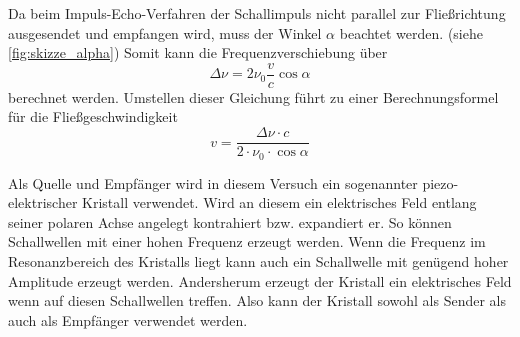 Da beim Impuls-Echo-Verfahren der Schallimpuls nicht parallel zur Fließrichtung ausgesendet und empfangen wird, muss der Winkel $\alpha$ beachtet werden. (siehe \autoref{fig:skizze_alpha})
Somit kann die Frequenzverschiebung über
\begin{equation}
    \Delta \nu = 2 \nu_0 \frac{v}{c} \cos \alpha
    \label{eq:Frequenzverschiebung}
\end{equation}
berechnet werden.
Umstellen dieser Gleichung führt zu einer Berechnungsformel für die Fließgeschwindigkeit
\begin{equation}
    v = \frac{\Delta \nu \cdot c}{2 \cdot \nu_0 \cdot \cos \alpha}
    \label{eq:geschwindigkeit}
\end{equation}

Als Quelle und Empfänger wird in diesem Versuch ein sogenannter piezo-elektrischer Kristall verwendet.
Wird an diesem ein elektrisches Feld entlang seiner polaren Achse angelegt kontrahiert bzw. expandiert er.
So können Schallwellen mit einer hohen Frequenz erzeugt werden.
Wenn die Frequenz im Resonanzbereich des Kristalls liegt kann auch ein Schallwelle mit genügend hoher Amplitude erzeugt werden.
Andersherum erzeugt der Kristall ein elektrisches Feld wenn auf diesen Schallwellen treffen.
Also kann der Kristall sowohl als Sender als auch als Empfänger verwendet werden.